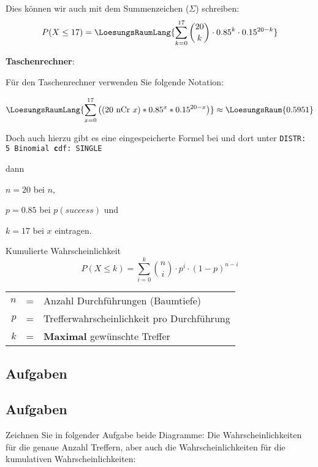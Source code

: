 Dies können wir auch mit dem Summenzeichen ($\Sigma$) schreiben:
$$P(X\le 17) = \LoesungsRaumLang{\sum_{k=0}^{17} {20 \choose k} \cdot 0.85^k \cdot 0.15^{20-k}}$$

\newpage
\textbf{Taschenrechner}:

\leserluft

Für den Taschenrechner verwenden Sie folgende Notation: 

$$\LoesungsRaumLang{\sum_{x=0}^{17}\left(( 20 \text{\,\,nCr\,\,} x ) * 0.85^x *
0.15^{20-x}\right)} \approx \LoesungsRaum{0.5951}$$


Doch auch hierzu gibt es eine eingespeicherte Formel
bei
 und dort unter \texttt{DISTR: 5
  Binomial\textbf{\color{red} c}df: SINGLE}

dann

$n=20$ bei $n$,

$p=0.85$ bei $p(success)$ und

$k=17$ bei $x$ eintragen.



\begin{gesetz}{Kumulierte Wahrscheinlichkeit}{}
  $$P(X \le k) = \sum_{i=0}^k {n \choose i} \cdot{} p^i \cdot{} (1-p)^{n-i}$$


\begin{tabular}{rcl}
  $n$ &=& Anzahl Durchführungen (Baumtiefe)\\
  $p$ &=& Trefferwahrscheinlichkeit pro Durchführung\\
  $k$ &=& \textbf{Maximal} gewünschte Treffer\\
\end{tabular}

\end{gesetz}


\subsection*{Aufgaben}

\newpage

\subsection*{Aufgaben}

Zeichnen Sie in folgender Aufgabe beide Diagramme: Die
Wahrscheinlichkeiten für die genaue Anzahl Treffern, aber auch die
Wahrscheinlichkeiten für die kumulativen Wahrscheinlichkeiten:

